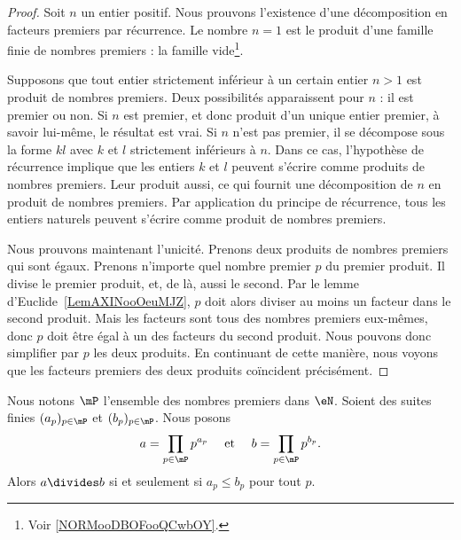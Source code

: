 \begin{proof}
	Soit \( n\) un entier positif. Nous prouvons l'existence d'une décomposition en facteurs premiers par récurrence. Le nombre \( n=1\) est le produit d'une famille finie de nombres premiers : la famille vide\footnote{Voir \ref{NORMooDBOFooQCwbOY}.}.

	Supposons que tout entier strictement inférieur à un certain entier \( n>1\) est produit de nombres premiers. Deux possibilités apparaissent pour \( n\) : il est premier ou non. Si \( n\) est premier, et donc produit d'un unique entier premier, à savoir lui-même, le résultat est vrai. Si \( n\) n'est pas premier, il se décompose sous la forme \( kl\) avec \( k\) et \( l\) strictement inférieurs à \( n\). Dans ce cas, l'hypothèse de récurrence implique que les entiers \( k\) et \( l\) peuvent s'écrire comme produits de nombres premiers. Leur produit aussi, ce qui fournit une décomposition de \( n\) en produit de nombres premiers. Par application du principe de récurrence, tous les entiers naturels peuvent s'écrire comme produit de nombres premiers.

	Nous prouvons maintenant l'unicité. Prenons deux produits de nombres premiers qui sont égaux. Prenons n'importe quel nombre premier \( p\) du premier produit. Il divise le premier produit, et, de là, aussi le second. Par le lemme d'Euclide~\ref{LemAXINooOeuMJZ}, \( p\) doit alors diviser au moins un facteur dans le second produit. Mais les facteurs sont tous des nombres premiers eux-mêmes, donc \( p\) doit être égal à un des facteurs du second produit. Nous pouvons donc simplifier par \( p\) les deux produits. En continuant de cette manière, nous voyons que les facteurs premiers des deux produits coïncident précisément.
\end{proof}

\begin{lemma}        \label{LEMooDTQQooYoJABt}
	Nous notons \( \mP\) l'ensemble des nombres premiers dans \( \eN\). Soient des suites finies \( (a_p)_{p\in \mP}\) et \( (b_p)_{p\in \mP}\). Nous posons
	\begin{equation}
		\begin{aligned}[]
			a & =\prod_{ p\in\mP}p^{a_p} & \text{ et } &  & b=\prod_{ p\in \mP}p^{b_p}.
		\end{aligned}
	\end{equation}
	Alors \( a\divides b\) si et seulement si \( a_p\leq b_p\) pour tout \( p\).
\end{lemma}

